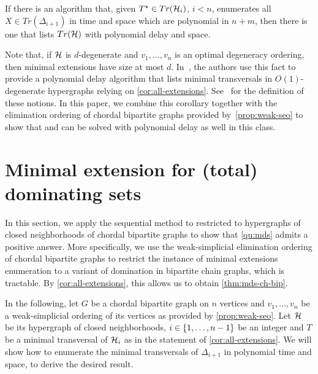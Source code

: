 \begin{corollary}\label{cor:all-extensions}
    If there is an algorithm that, given \(T^{\star} \in Tr(\mathcal{H}_{i})\), $i<n$, enumerates all $X\in Tr(\Delta_{i+1})$ in time and space which are polynomial in $n+m$, 
    then there is one that lists \(Tr(\mathcal{H})\) with polynomial delay and space.
\end{corollary}

Note that, if $\mathcal{H}$ is $d$-degenerate and $v_1,\dots,v_n$ is an optimal degeneracy ordering, then minimal extensions have size at most $d$.
In~\cite{eiter2003new}, the authors use this fact to provide a polynomial delay algorithm that lists minimal transversals in $O(1)$-degenerate hypergraphs relying on \autoref{cor:all-extensions}.
See~\cite{eiter2003new,bartier2024hypergraph} for the definition of these notions.
In this paper, we combine this corollary together with the elimination ordering of chordal bipartite graphs provided by~\autoref{prop:weak-seo} to show that \domenum{} and \tdomenum{} can be solved with polynomial delay as well in this class. 

\section{Minimal extension for (total) dominating sets}\label{sec:mds-and-mtds}

In this section, we apply the sequential method to \transenum{} restricted to hypergraphs of closed neighborhoods of chordal bipartite graphs to show that \autoref{qu:mds} admits a positive answer.
More specifically, we use the weak-simplicial elimination ordering of chordal bipartite graphs to restrict the instance of minimal extensions enumeration to a variant of domination in bipartite chain graphs, which is tractable.
By \autoref{cor:all-extensions}, this allows us to obtain \autoref{thm:mds-ch-bip}.

In the following, let $G$ be a chordal bipartite graph on $n$ vertices and $v_1,\dots,v_n$  
be a weak-simplicial ordering of its vertices as provided by \autoref{prop:weak-seo}.
Let $\mathcal{H}$ be its hypergraph of closed neighborhoods, $ i \in \{1,\dots,n-1\}$ be an integer and $T$ be a minimal transversal of $\mathcal{H}_i$ as in the statement of \autoref{cor:all-extensions}.
We will show how to enumerate the minimal transversals of $\Delta_{i+1}$ in polynomial time and space, to derive the desired result. 

